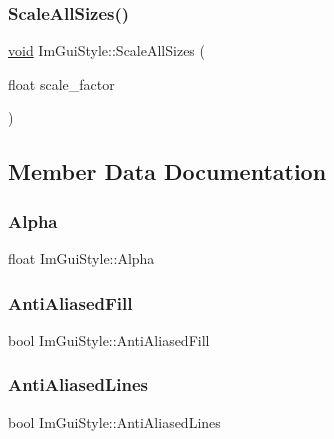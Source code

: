 \subsubsection{\texorpdfstring{Scale\+All\+Sizes()}{ScaleAllSizes()}}
{\footnotesize\ttfamily \hyperlink{imgui__impl__opengl3__loader_8h_ac668e7cffd9e2e9cfee428b9b2f34fa7}{void} Im\+Gui\+Style\+::\+Scale\+All\+Sizes (\begin{DoxyParamCaption}\item[{float}]{scale\+\_\+factor }\end{DoxyParamCaption})}



\subsection{Member Data Documentation}
\mbox{\label{structImGuiStyle_a993312606e9dcb7ca165245150a4da72}} 
\subsubsection{\texorpdfstring{Alpha}{Alpha}}
{\footnotesize\ttfamily float Im\+Gui\+Style\+::\+Alpha}

\mbox{\label{structImGuiStyle_a1fcc22c258a2a73bd61efd18e7ce7e5a}} 
\subsubsection{\texorpdfstring{Anti\+Aliased\+Fill}{AntiAliasedFill}}
{\footnotesize\ttfamily bool Im\+Gui\+Style\+::\+Anti\+Aliased\+Fill}

\mbox{\label{structImGuiStyle_a0164b54454297971d40f3578b2c1ffeb}} 
\subsubsection{\texorpdfstring{Anti\+Aliased\+Lines}{AntiAliasedLines}}
{\footnotesize\ttfamily bool Im\+Gui\+Style\+::\+Anti\+Aliased\+Lines}

